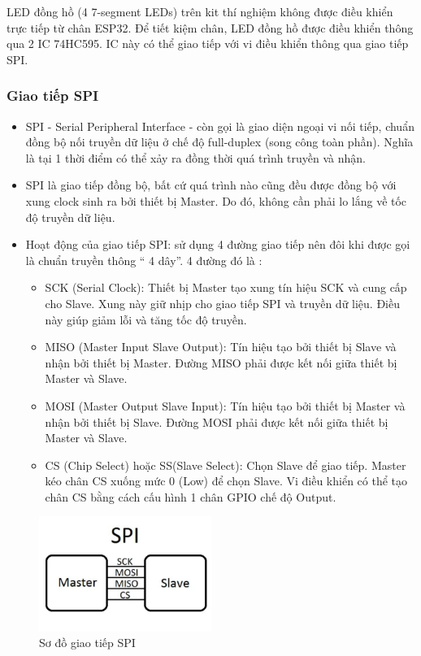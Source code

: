 LED đồng hồ (4 7-segment LEDs) trên kit thí nghiệm không được điều khiển trực tiếp từ chân ESP32. Để tiết kiệm chân, LED đồng hồ được điều khiển thông qua 2 IC 74HC595. IC này có thể giao tiếp với vi điều khiển thông qua giao tiếp SPI.

\subsubsection{Giao tiếp SPI}
\begin{itemize}
    \item SPI - Serial Peripheral Interface - còn gọi là giao diện ngoại vi nối tiếp, chuẩn đồng bộ nối truyền dữ liệu ở chế độ full-duplex (song công toàn phần). Nghĩa là tại 1 thời điểm có thể xảy ra đồng thời quá trình truyền và nhận.
    \item SPI là giao tiếp đồng bộ, bất cứ quá trình nào cũng đều được đồng bộ với xung clock sinh ra bởi thiết bị Master. Do đó, không cần phải lo lắng về tốc độ truyền dữ liệu.
    \item Hoạt động của giao tiếp SPI: sử dụng 4 đường giao tiếp nên đôi khi được gọi là chuẩn truyền thông “ 4 dây”. 4 đường đó là :
    \begin{itemize}
        \item SCK (Serial Clock): Thiết bị Master tạo xung tín hiệu SCK và cung cấp cho Slave. Xung này giữ nhịp cho giao tiếp SPI và truyền dữ liệu. Điều này giúp giảm lỗi và tăng tốc độ truyền.
        \item MISO (Master Input Slave Output): Tín hiệu tạo bởi thiết bị Slave và nhận bởi thiết bị Master. Đường MISO phải được kết nối giữa thiết bị Master và Slave.
        \item MOSI (Master Output Slave Input): Tín hiệu tạo bởi thiết bị Master và nhận bởi thiết bị Slave. Đường MOSI phải được kết nối giữa thiết bị Master và Slave.
        \item CS (Chip Select) hoặc SS(Slave Select): Chọn Slave để giao tiếp. Master kéo chân CS xuống mức 0 (Low) để chọn Slave. Vi điều khiển có thể tạo chân CS bằng cách cấu hình 1 chân GPIO chế độ Output.
    \end{itemize}
\end{itemize}
\begin{figure}[ht]
    \centering
    \includegraphics[width=0.5\textwidth]{graphics/spi.jpg}
    \caption{Sơ đồ giao tiếp SPI}
\end{figure}


